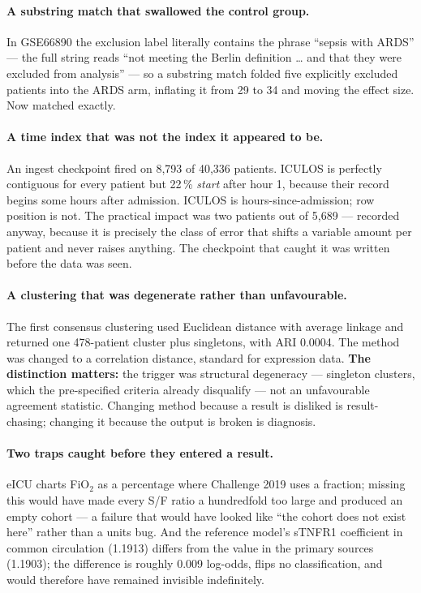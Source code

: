\documentclass[11pt,letterpaper]{article}
\newcommand{\Fio}{FiO$_2$}
\begin{document}
\paragraph{A substring match that swallowed the control group.}
In GSE66890 the exclusion label literally contains the phrase ``sepsis with ARDS'' --- the
full string reads ``not meeting the Berlin definition \ldots{} and that they were excluded
from analysis'' --- so a substring match folded five explicitly excluded patients into the
ARDS arm, inflating it from 29 to 34 and moving the effect size. Now matched exactly.

\paragraph{A time index that was not the index it appeared to be.}
An ingest checkpoint fired on 8,793 of 40,336 patients. ICULOS is perfectly contiguous for
every patient but 22\,\% \emph{start} after hour 1, because their record begins some hours
after admission. ICULOS is hours-since-admission; row position is not. The practical impact
was two patients out of 5,689 --- recorded anyway, because it is precisely the class of error
that shifts a variable amount per patient and never raises anything. The checkpoint that
caught it was written before the data was seen.

\paragraph{A clustering that was degenerate rather than unfavourable.}
The first consensus clustering used Euclidean distance with average linkage and returned one
478-patient cluster plus singletons, with ARI 0.0004. The method was changed to a
correlation distance, standard for expression data. \textbf{The distinction matters:} the
trigger was structural degeneracy --- singleton clusters, which the pre-specified criteria
already disqualify --- not an unfavourable agreement statistic. Changing method because a
result is disliked is result-chasing; changing it because the output is broken is diagnosis.

\paragraph{Two traps caught before they entered a result.}
eICU charts \Fio{} as a percentage where Challenge 2019 uses a fraction; missing this would
have made every S/F ratio a hundredfold too large and produced an empty cohort --- a failure
that would have looked like ``the cohort does not exist here'' rather than a units bug. And
the reference model's sTNFR1 coefficient in common circulation (1.1913) differs from the
value in the primary sources (1.1903); the difference is roughly 0.009 log-odds, flips no
classification, and would therefore have remained invisible indefinitely.
\end{document}
